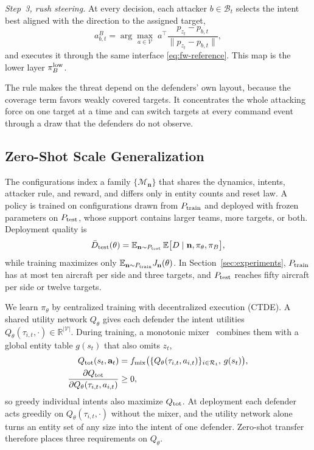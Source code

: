 \emph{Step~3, rush steering.} At every decision, each attacker $b\in\mathcal B_t$ selects the intent best aligned with the direction to the assigned target,
\begin{equation}
a^B_{b,t}=\arg\max_{a\in\mathcal V}\;a^\top\frac{p_{z_t}-p_{b,t}}{\|p_{z_t}-p_{b,t}\|},
\label{eq:fw-rush}
\end{equation}
and executes it through the same interface \eqref{eq:fw-reference}. This map is the lower layer $\pi_B^{\rm low}$.

The rule makes the threat depend on the defenders' own layout, because the coverage term favors weakly covered targets. It concentrates the whole attacking force on one target at a time and can switch targets at every command event through a draw that the defenders do not observe.

\subsection{Zero-Shot Scale Generalization}
\label{subsec:pf-generalization}
\label{subsec:pf-requirements}

The configurations index a family $\{\mathcal M_{\mathbf n}\}$ that shares the dynamics, intents, attacker rule, and reward, and differs only in entity counts and reset law. A policy is trained on configurations drawn from $P_{\rm train}$ and deployed with frozen parameters on $P_{\rm test}$, whose support contains larger teams, more targets, or both. Deployment quality is
\begin{equation}
\bar D_{\rm test}(\theta)=\mathbb E_{\mathbf n\sim P_{\rm test}}\,\mathbb E\big[D\mid\mathbf n,\pi_\theta,\pi_B\big],
\label{eq:fw-transfer}
\end{equation}
while training maximizes only $\mathbb E_{\mathbf n\sim P_{\rm train}}J_{\mathbf n}(\theta)$. In Section~\ref{sec:experiments}, $P_{\rm train}$ has at most ten aircraft per side and three targets, and $P_{\rm test}$ reaches fifty aircraft per side or twelve targets.

We learn $\pi_\theta$ by centralized training with decentralized execution (CTDE). A shared utility network $Q_\theta$ gives each defender the intent utilities $Q_\theta(\tau_{i,t},\cdot)\in\mathbb R^{|\mathcal V|}$. During training, a monotonic mixer~\cite{rashid2018qmix} combines them with a global entity table $g(s_t)$ that also omits $z_t$,
\begin{align}
Q_{\rm tot}(s_t,\mathbf a_t)&=f_{\rm mix}\big(\{Q_\theta(\tau_{i,t},a_{i,t})\}_{i\in\mathcal R_t},\,g(s_t)\big),\nonumber\\
\frac{\partial Q_{\rm tot}}{\partial Q_\theta(\tau_{i,t},a_{i,t})}&\ge0,
\label{eq:fw-mixing}
\end{align}
so greedy individual intents also maximize $Q_{\rm tot}$. At deployment each defender acts greedily on $Q_\theta(\tau_{i,t},\cdot)$ without the mixer, and the utility network alone turns an entity set of any size into the intent of one defender. Zero-shot transfer therefore places three requirements on $Q_\theta$.

